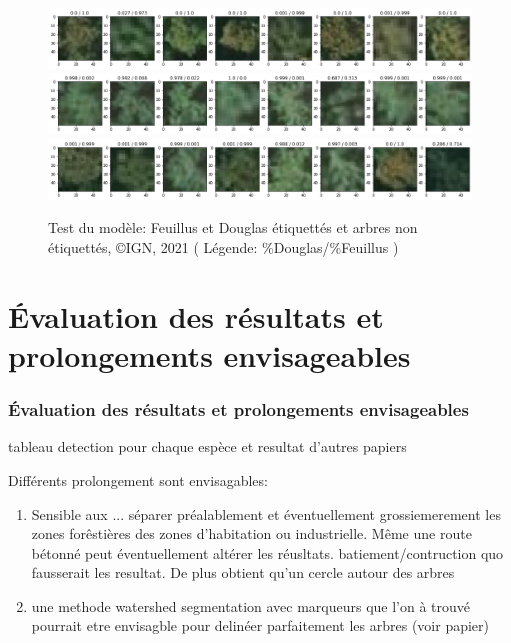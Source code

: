 \documentclass{beamer}
\begin{document}
\begin{frame}
	\begin{figure}
		\includegraphics[scale=0.3]{res3.png}
		\includegraphics[scale=0.3]{res4.png}
		\includegraphics[scale=0.3]{res5.png}
		\caption{Test du modèle: Feuillus et Douglas étiquettés et arbres non étiquettés, \copyright IGN, 2021 ( Légende: \%Douglas/\%Feuillus )}
	\end{figure}
\end{frame}

\section{\'{E}valuation des résultats et prolongements envisageables}

\begin{frame}
	\frametitle{\'{E}valuation des résultats et prolongements envisageables}
	tableau detection pour chaque espèce et resultat d'autres papiers 
\end{frame}

\begin{frame}
	Différents prolongement sont envisagables: 
	\begin{enumerate}
	\item Sensible aux ... séparer préalablement et éventuellement grossiemerement les zones forêstières des zones d'habitation ou  industrielle. Même une route bétonné peut éventuellement altérer les réusltats. batiement/contruction quo fausserait les resultat. 
	De plus obtient qu'un cercle autour des arbres
	\item une methode watershed segmentation avec marqueurs que l'on à trouvé pourrait etre envisagble pour delinéer parfaitement les arbres (voir papier) 
	\end{enumerate}
\end{frame}
\end{document}
